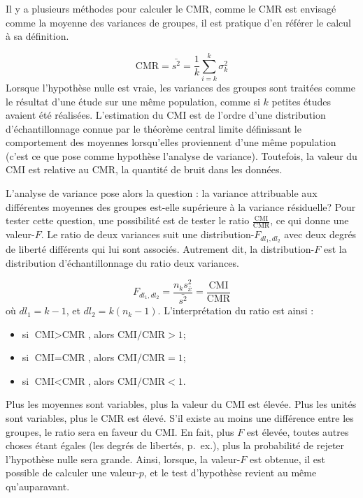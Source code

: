 \documentclass[
]{book}
\providecommand{\tightlist}{%
  \setlength{\itemsep}{0pt}\setlength{\parskip}{0pt}}
\begin{document}
Il y a plusieurs méthodes pour calculer le CMR, comme le CMR est envisagé comme la moyenne des variances de groupes, il est pratique d'en référer le calcul à sa définition.

\[
\text{CMR} = \bar{s^2} = \frac{1}{k}\sum_{i=k}^k\sigma_k^2 
\]
Lorsque l'hypothèse nulle est vraie, les variances des groupes sont traitées comme le résultat d'une étude sur une même population, comme si \(k\) petites études avaient été réalisées. L'estimation du CMI est de l'ordre d'une distribution d'échantillonnage connue par le théorème central limite définissant le comportement des moyennes lorsqu'elles proviennent d'une même population (c'est ce que pose comme hypothèse l'analyse de variance). Toutefois, la valeur du CMI est relative au CMR, la quantité de bruit dans les données.

L'analyse de variance pose alors la question : la variance attribuable aux différentes moyennes des groupes est-elle supérieure à la variance résiduelle? Pour tester cette question, une possibilité est de tester le ratio \(\frac{\text{CMI}}{\text{CMR}}\), ce qui donne une valeur-\(F\). Le ratio de deux variances suit une distribution-\(F_{dl_1, dl_2}\) avec deux degrés de liberté différents qui lui sont associés. Autrement dit, la distribution-\(F\) est la distribution d'échantillonnage du ratio deux variances.

\[F_{dl_1,dl_2} = \frac{n_ks^2_{\bar{x}}}{\bar{s^2}} = \frac{\text{CMI}}{\text{CMR}}\]
où \(dl_1 = k-1\), et \(dl_2 = k(n_k-1)\). L'interprétation du ratio est ainsi :

\begin{itemize}
\tightlist
\item
  si \(\text{CMI}>\text{CMR}\), alors \(\text{CMI}/\text{CMR}>1\);
\item
  si \(\text{CMI}=\text{CMR}\), alors \(\text{CMI}/\text{CMR}=1\);
\item
  si \(\text{CMI}<\text{CMR}\), alors \(\text{CMI}/\text{CMR}<1\).
\end{itemize}

Plus les moyennes sont variables, plus la valeur du CMI est élevée. Plus les unités sont variables, plus le CMR est élevé. S'il existe au moins une différence entre les groupes, le ratio sera en faveur du CMI. En fait, plus \(F\) est élevée, toutes autres choses étant égales (les degrés de libertés, p.~ex.), plus la probabilité de rejeter l'hypothèse nulle sera grande. Ainsi, lorsque, la valeur-\(F\) est obtenue, il est possible de calculer une valeur-\(p\), et le test d'hypothèse revient au même qu'auparavant.
\end{document}

